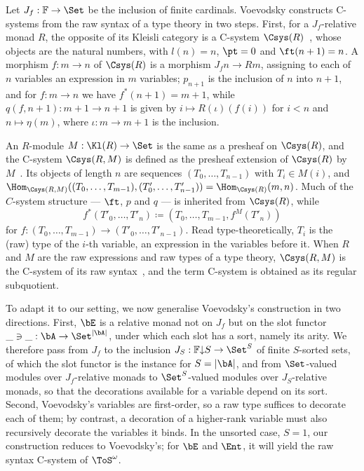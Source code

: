 Let $J_f : \mathbb{F} \to \Set$ be the inclusion of finite cardinals. Voevodsky constructs C-systems from the raw syntax of a type theory in two steps. First, for a $J_f$-relative monad $R$, the opposite of its Kleisli category is a C-system $\Csys(R)$~\cite[\S5]{Voevodsky2016Relative}, whose objects are the natural numbers, with $l(n) = n$, $\pt = 0$ and $\ft(n + 1) = n$. A morphism $f : m \to n$ of $\Csys(R)$ is a morphism $J_f n \to Rm$, assigning to each of $n$ variables an expression in $m$ variables; $p_{n+1}$ is the inclusion of $n$ into $n + 1$, and for $f : m \to n$ we have $f^*(n + 1) = m + 1$, while $q(f, n + 1) : m + 1 \to n + 1$ is given by $i \mapsto R(\iota)(f(i))$ for $i < n$ and $n \mapsto \eta(m)$, where $\iota : m \to m + 1$ is the inclusion.

An $R$-module $M : \Kl(R) \to \Set$ is the same as a presheaf on $\Csys(R)$, and the C-system $\Csys(R, M)$ is defined as the presheaf extension of $\Csys(R)$ by $M$~\cite[\S\S3 and~6]{Voevodsky2016Relative}. Its objects of length $n$ are sequences $(T_0, \ldots, T_{n-1})$ with $T_i \in M(i)$, and $\Hom_{\Csys(R,M)}((T_0, \ldots, T_{m-1}), (T'_0, \ldots, T'_{n-1})) = \Hom_{\Csys(R)}(m,n)$. Much of the $C$-system structure --- $\ft$, $p$ and $q$ --- is inherited from $\Csys(R)$, while
\[
f^*(T'_0, \ldots, T'_n) \coloneqq (T_0, \ldots, T_{m-1}, f^M(T'_n))
\]
for $f : (T_0, \ldots, T_{m-1}) \to (T'_0, \ldots, T'_{n-1})$. Read type-theoretically, $T_i$ is the (raw) type of the $i$-th variable, an expression in the variables before it. When $R$ and $M$ are the raw expressions and raw types of a type theory, $\Csys(R, M)$ is the C-system of its raw syntax~\cite[\S\S1 and~6]{Voevodsky2016Relative}, and the term C-system is obtained as its regular subquotient.

To adapt it to our setting, we now generalise Voevodsky's construction in two directions. First, $\bE$ is a relative monad not on $J_f$ but on the slot functor $\_ \ni \_ : \bA \to \Set^{\left|\bA\right|}$, under which each slot has a sort, namely its arity. We therefore pass from $J_f$ to the inclusion $J_S : \mathbb{F}{\downarrow}S \to \Set^S$ of finite $S$-sorted sets, of which the slot functor is the instance for $S = \left|\bA\right|$, and from $\Set$-valued modules over $J_f$-relative monads to $\Set^S$-valued modules over $J_S$-relative monads, so that the decorations available for a variable depend on its sort.
Second, Voevodsky's variables are first-order, so a raw type suffices to decorate each of them; by contrast, a decoration of a higher-rank variable must also recursively decorate the variables it binds.
In the unsorted case, $S = 1$, our construction reduces to Voevodsky's; for $\bE$ and $\Ent$, it will yield the raw syntax C-system of $\ToS^{\omega}$.

